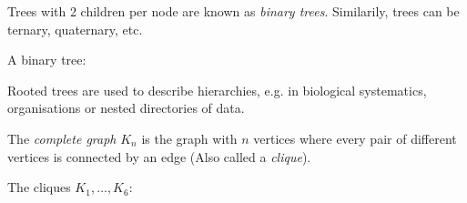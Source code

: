 Trees with 2 children per node are known as \emph{binary trees}. Similarily, trees can be ternary, quaternary, etc.
\begin{example}
  A binary tree:
  \begin{figure}[H]
  \centering
  \end{figure}
\end{example}

Rooted trees are used to describe hierarchies, e.g. in biological systematics, organisations or nested directories of data.

The \emph{complete graph} $K_{n}$ is the graph with $n$ vertices where every pair of different vertices is connected by an edge (Also called a \emph{clique}).

\begin{example}
  The cliques $K_{1}, \dots, K_{6}$:
  \newcommand{\clique}[3]{
  \pgfmathsetmacro{\ang}{180-((#1-2)*180/#1)}
  \pgfmathsetmacro{\rad}{#2}
  \pgfmathsetmacro{\anull}{90}
  \pgfmathsetmacro{\xnull}{#3}

  \foreach \n in {1,...,#1}{
  \node[circle, font=\sffamily\bfseries, draw=black, very thick, fill=col2!50, text width=0.25em] (p\n) at ({#2*cos(\n*\ang+\anull)+\xnull},{#2*sin(\n*\ang+\anull)}) { };
  \foreach \m in {1,...,\n}{
  \draw[-, very thick] (p\n) to (p\m);
  }
  }
  
  \node at (\xnull,-1.5cm) {$K_{#1}$};
  }

  \begin{figure}[H]
  \centering
  \end{figure}
\end{example}
